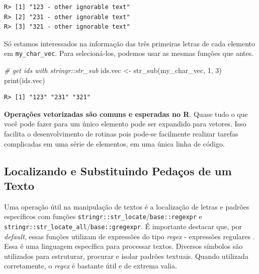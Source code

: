 \documentclass[
  11pt,
]{book}
\newenvironment{Shaded}{\begin{snugshade}}{\end{snugshade}}
\newcommand{\CommentTok}[1]{\textcolor[rgb]{0.37,0.37,0.37}{\textit{#1}}}
\newcommand{\DecValTok}[1]{\textcolor[rgb]{0.06,0.06,0.06}{#1}}
\newcommand{\FunctionTok}[1]{\textcolor[rgb]{0,0,0}{#1}}
\newcommand{\NormalTok}[1]{#1}
\newcommand{\OtherTok}[1]{\textcolor[rgb]{0.37,0.37,0.37}{#1}}
\newenvironment{rmdimportant}
{\begin{importantblock}

	} {\end{importantblock}}
\begin{document}
\begin{verbatim}
R> [1] "123 - other ignorable text"
R> [2] "231 - other ignorable text"
R> [3] "321 - other ignorable text"
\end{verbatim}

Só estamos interessados na informação das três primeiras letras de cada elemento em \texttt{my\_char\_vec}. Para selecioná-los, podemos usar as mesmas funções que antes.

\begin{Shaded}
\begin{Highlighting}[]
\CommentTok{\# get ids with stringr::str\_sub}
\NormalTok{ids.vec }\OtherTok{\textless{}{-}} \FunctionTok{str\_sub}\NormalTok{(my\_char\_vec, }\DecValTok{1}\NormalTok{, }\DecValTok{3}\NormalTok{)}
\FunctionTok{print}\NormalTok{(ids.vec)}
\end{Highlighting}
\end{Shaded}

\begin{verbatim}
R> [1] "123" "231" "321"
\end{verbatim}

\begin{rmdimportant}
\textbf{Operações vetorizadas são comuns e esperadas no R}. Quase tudo o
que você pode fazer para um único elemento pode ser expandido para
vetores. Isso facilita o desenvolvimento de rotinas pois pode-se
facilmente realizar tarefas complicadas em uma série de elementos, em
uma única linha de código.
\end{rmdimportant}

\hypertarget{localizando-e-substituindo-pedauxe7os-de-um-texto}{%
\subsection{Localizando e Substituindo Pedaços de um Texto}\label{localizando-e-substituindo-pedauxe7os-de-um-texto}}

Uma operação útil na manipulação de textos é a localização de letras e padrões específicos com funções \texttt{stringr::str\_locate}/\texttt{base::regexpr} e \texttt{stringr::str\_locate\_all}/\texttt{base::gregexpr}. É importante destacar que, por \emph{default}, essas funções utilizam de expressões do tipo \emph{regex} - expressões regulares \citep{thompson1968programming}. Essa é uma linguagem específica para processar textos. Diversos símbolos são utilizados para estruturar, procurar e isolar padrões textuais. Quando utilizada corretamente, o \emph{regex} é bastante útil e de extrema valia.  
\end{document}
